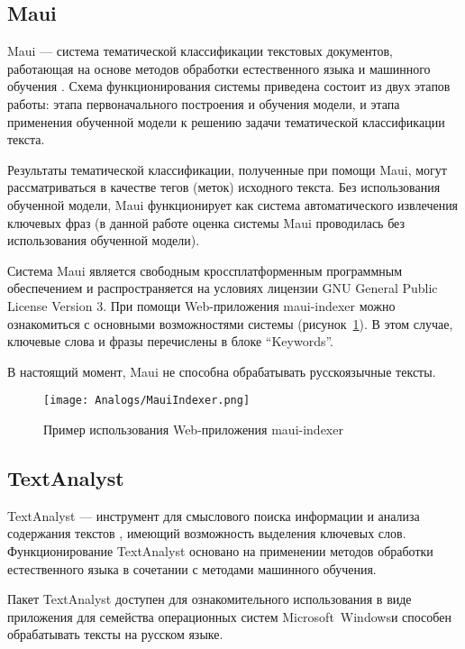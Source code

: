 \subsection{Maui}
\label{subsec:Maui}
Maui — система тематической классификации текстовых документов,
работающая на основе методов обработки естественного языка и
машинного обучения \cite{Medelyan09}. Схема функционирования
системы приведена состоит из двух этапов работы: этапа
первоначального построения и обучения модели, и этапа
применения обученной модели к решению задачи тематической
классификации текста.

Результаты тематической классификации, полученные при помощи Maui,
могут рассматриваться в качестве тегов (меток) исходного текста.
Без использования обученной модели, Maui функционирует как система
автоматического извлечения ключевых фраз (в данной работе оценка
системы Maui проводилась без использования обученной модели).

Система Maui является свободным кроссплатформенным программным
обеспечением и распространяется на условиях лицензии GNU General
Public License Version 3. При помощи Web-приложения maui-indexer
\cite{Maui} можно ознакомиться с основными возможностями системы
(рисунок~\ref{fig:Analogs:Maui}). В этом случае, ключевые слова и
фразы перечислены в блоке “Keywords”.

В настоящий момент, Maui не способна обрабатывать русскоязычные
тексты.

\begin{landscape}
\begin{figure}[ht]
  \centering
  \texttt{[image: Analogs/MauiIndexer.png]}
  \caption{Пример использования Web-приложения maui-indexer}
  \label{fig:Analogs:Maui}
\end{figure}
\end{landscape}

\subsection{TextAnalyst}
\label{subsec:TextAnalyst}
TextAnalyst — инструмент для смыслового поиска информации и анализа
содержания текстов \cite{TextAnalyst}, имеющий возможность выделения
ключевых слов. Функционирование TextAnalyst основано на применении
методов обработки естественного языка в сочетании с методами
машинного обучения.

Пакет TextAnalyst доступен для ознакомительного использования в
виде приложения для семейства операционных систем
Microsoft\textregistered~Windows\textregistered и способен
обрабатывать тексты на русском языке.

